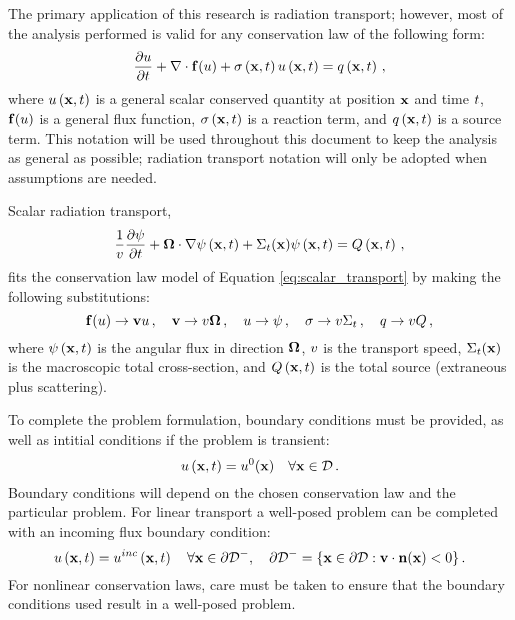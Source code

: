 The primary application of this research is radiation transport;
however, most of the analysis performed is valid
for any conservation law of the following form:
\begin{equation}\label{eq:scalar_transport}
   \frac{\partial u}{\partial t} + \nabla\cdot\mathbf{f}(u)
   + \sigma\left(\mathbf{x},t\right) u\left(\mathbf{x},t\right) = q\left(\mathbf{x},t\right) \,,
\end{equation}
where $u\left(\mathbf{x},t\right)$ is a general scalar conserved quantity at position
$\mathbf{x}$ and time $t$, $\mathbf{f}(u)$ is a general flux
function,
$\sigma\left(\mathbf{x},t\right)$ is a reaction term, and $q\left(\mathbf{x},t\right)$ is a source
term. This notation will be used throughout this document to keep
the analysis as general as possible; radiation transport notation
will only be adopted when assumptions are needed.

Scalar radiation transport,
\begin{equation}\label{eq:rad_transport}
  \frac{1}{v}\frac{\partial \psi}{\partial t} + \mathbf{\Omega}\cdot\nabla\psi\left(\mathbf{x},t\right)
  + \Sigma_t(\mathbf{x})\psi\left(\mathbf{x},t\right) = Q\left(\mathbf{x},t\right) \,,
\end{equation}
fits the conservation law model of Equation \eqref{eq:scalar_transport} by
making the following substitutions:
\[
  \mathbf{f}(u)\rightarrow\mathbf{v}u
  \,, \quad
  \mathbf{v}\rightarrow v\mathbf{\Omega}
  \,, \quad
  u\rightarrow\psi
  \,, \quad
  \sigma\rightarrow v\Sigma_t
  \,, \quad
  q\rightarrow vQ
  \,,
\]
where $\psi\left(\mathbf{x},t\right)$ is the angular flux in direction $\mathbf{\Omega}$,
$v$ is the transport speed, $\Sigma_t(\mathbf{x})$
is the macroscopic total cross-section, and $Q\left(\mathbf{x},t\right)$ is the
total source (extraneous plus scattering).

To complete the problem formulation, boundary
conditions must be provided, as well as intitial conditions if the
problem is transient:
\begin{equation}
   u\left(\mathbf{x},t\right) = u^0(\mathbf{x})
   \quad \forall \mathbf{x}\in\mathcal{D} \,.
\end{equation}
Boundary conditions will depend on the chosen conservation law and
the particular problem. 
For linear transport a well-posed problem can be completed with an incoming flux
boundary condition:
\begin{equation}
   u\left(\mathbf{x},t\right) = u^{inc}\left(\mathbf{x},t\right) \quad \forall \mathbf{x}
   \in \partial\mathcal{D}^-,
     \quad \partial\mathcal{D}^- = \{\mathbf{x}\in\partial\mathcal{D}:
     \mathbf{v}\cdot\mathbf{n}(\mathbf{x})<0\} \,.
\end{equation}
For nonlinear conservation laws, care must be taken to ensure that the
boundary conditions used result in a well-posed problem.
